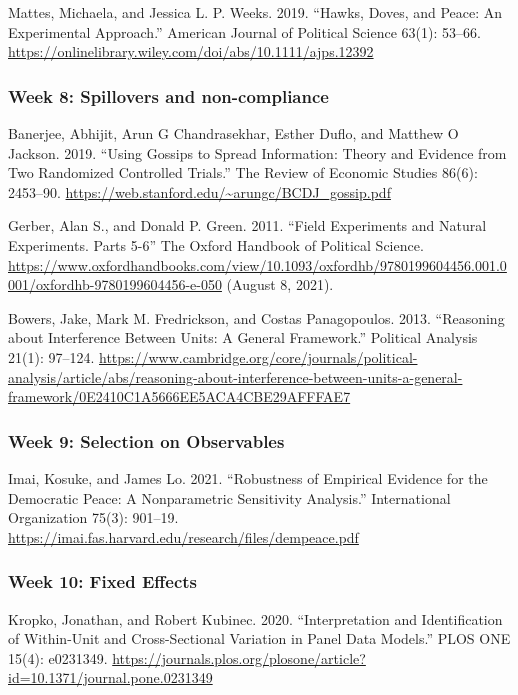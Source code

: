 \documentclass[
  11pt,
]{article}
\begin{document}
Mattes, Michaela, and Jessica L. P. Weeks. 2019. ``Hawks, Doves, and
Peace: An Experimental Approach.'' American Journal of Political Science
63(1): 53--66.
\url{https://onlinelibrary.wiley.com/doi/abs/10.1111/ajps.12392}

\hypertarget{week-8-spillovers-and-non-compliance}{%
\subsubsection{Week 8: Spillovers and
non-compliance}\label{week-8-spillovers-and-non-compliance}}

Banerjee, Abhijit, Arun G Chandrasekhar, Esther Duflo, and Matthew O
Jackson. 2019. ``Using Gossips to Spread Information: Theory and
Evidence from Two Randomized Controlled Trials.'' The Review of Economic
Studies 86(6): 2453--90.
\url{https://web.stanford.edu/~arungc/BCDJ_gossip.pdf}

Gerber, Alan S., and Donald P. Green. 2011. ``Field Experiments and
Natural Experiments. Parts 5-6'' The Oxford Handbook of Political
Science.
\url{https://www.oxfordhandbooks.com/view/10.1093/oxfordhb/9780199604456.001.0001/oxfordhb-9780199604456-e-050}
(August 8, 2021).

Bowers, Jake, Mark M. Fredrickson, and Costas Panagopoulos. 2013.
``Reasoning about Interference Between Units: A General Framework.''
Political Analysis 21(1): 97--124.
\url{https://www.cambridge.org/core/journals/political-analysis/article/abs/reasoning-about-interference-between-units-a-general-framework/0E2410C1A5666EE5ACA4CBE29AFFFAE7}

\hypertarget{week-9-selection-on-observables}{%
\subsubsection{Week 9: Selection on
Observables}\label{week-9-selection-on-observables}}

Imai, Kosuke, and James Lo. 2021. ``Robustness of Empirical Evidence for
the Democratic Peace: A Nonparametric Sensitivity Analysis.''
International Organization 75(3): 901--19.
\url{https://imai.fas.harvard.edu/research/files/dempeace.pdf}

\hypertarget{week-10-fixed-effects}{%
\subsubsection{Week 10: Fixed Effects}\label{week-10-fixed-effects}}

Kropko, Jonathan, and Robert Kubinec. 2020. ``Interpretation and
Identification of Within-Unit and Cross-Sectional Variation in Panel
Data Models.'' PLOS ONE 15(4): e0231349.
\url{https://journals.plos.org/plosone/article?id=10.1371/journal.pone.0231349}
\end{document}
